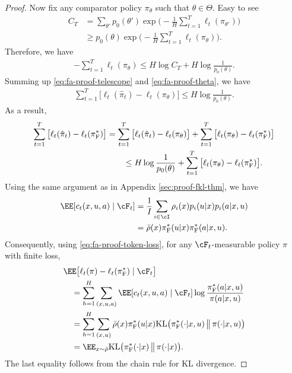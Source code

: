 \documentclass[11pt]{article}
\newcommand{\KL}{\text{KL}}
\newcommand{\pif}{\pi_{\mathrm{F}}}
\begin{document}
\begin{proof}
Now fix any comparator policy $\pi_\theta$ such that $\theta \in \Theta$. Easy to see
\begin{align*}
    C_T &= \sum_{\theta'}p_0(\theta')
    \exp\bigg(
        -\frac1H\sum_{t=1}^T\ell_t(\pi_{\theta'})
    \bigg)\\
    &\geq
    p_0(\theta)
    \exp\bigg(
        -\frac1H\sum_{t=1}^T\ell_t(\pi_\theta)
    \bigg).
\end{align*}
Therefore, we have
\begin{align}
    -\sum_{t=1}^T \ell_t(\pi_\theta) \le H \log C_T + H \log \frac{1}{p_0(\theta)}.
    \label{eq:fa-proof-theta}
\end{align}
Summing up \eqref{eq:fa-proof-telescope} and \eqref{eq:fa-proof-theta}, we have
\begin{align}
    \sum_{t=1}^T
    \big[
        \ell_t(\hat\pi_t)-\ell_t(\pi_\theta)
    \big]
    \leq
    H\log\frac1{p_0(\theta)}.
    \label{eq:fa-proof-comparator}
\end{align}
As a result, 
\begin{align}
    \sum_{t=1}^T
    \big[
        \ell_t(\hat\pi_t)-\ell_t(\pif^*)
    \big] &= \sum_{t=1}^T
    \big[
        \ell_t(\hat\pi_t)-\ell_t(\pi_{\theta})
    \big] + \sum_{t=1}^T
    \big[
        \ell_t(\pi_\theta)-\ell_t(\pif^*)
    \big]
    \notag\\
    &\qquad\leq
    H\log\frac1{p_0(\theta)}
    +
    \sum_{t=1}^T
    \big[
        \ell_t(\pi_\theta)-\ell_t(\pif^*)
    \big].
    \label{eq:fa-proof-empirical-oracle}
\end{align}
Using the same argument as in Appendix \ref{sec:proof-fkl-thm}, we have
\begin{align}
    \EE[c_t(x,u,a)\mid\cF_t]
    &=
    \frac1I\sum_{i\in\cI}
    \rho_i(x)p_i(u|x)p_i(a|x,u)
    \notag\\
    &=
    \bar\rho(x)\pif^*(u|x)\pif^*(a|x,u).
    \notag
\end{align}
Consequently, using \eqref{eq:fa-proof-token-loss}, for any $\cF_t$-measurable policy $\pi$ with finite
loss,
\begin{align}
    &\EE\big[
        \ell_t(\pi)-\ell_t(\pif^*)
        \mid\cF_t
    \big]
    \notag\\
    &\quad=
    \sum_{h=1}^H\sum_{(x,u,a)}
    \EE[c_t(x,u,a)\mid\cF_t]
    \log\frac{\pif^*(a|x,u)}{\pi(a|x,u)}
    \notag\\
    &\quad=
    \sum_{h=1}^H\sum_{(x,u)}
    \bar\rho(x)\pif^*(u|x)
    \KL\big(
        \pif^*(\cdot|x,u)
        \,\big\|\,
        \pi(\cdot|x,u)
    \big)
    \notag\\
    &\quad=
    \EE_{x\sim\bar\rho}
    \KL\big(
        \pif^*(\cdot|x)
        \,\big\|\,
        \pi(\cdot|x)
    \big).
    \label{eq:fa-proof-loss-to-kl}
\end{align}
The last equality follows from the chain rule for KL divergence.


\end{proof}
\end{document}
